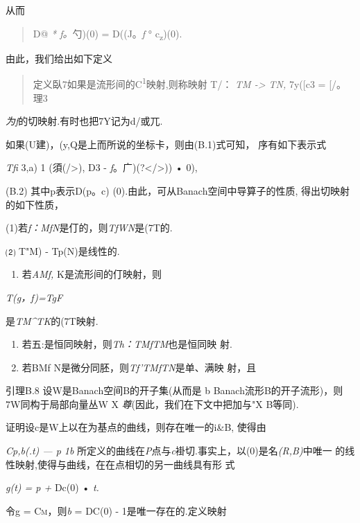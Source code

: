 从而

\begin{quote}
D@ \emph{* f。}勺)(0) = D((J。\emph{f} ° c\textsubscript{z})(0).
\end{quote}

由此，我们给出如下定义

\begin{quote}
定义臥7如果是流形间的C\textsuperscript{1}映射,则称映射 T/： \emph{TM
-\textgreater{} TN,} 7y({[}c3 = {[}/。理3
\end{quote}

\emph{为f}的切映射.有时也把7Y记为d/或兀.

如果(U建)，(y,Q是上而所说的坐标卡，则由(B.1)式可知， 序有如下表示式

\emph{Tfi} 3,a) 1 (須(/\textgreater{}), D3 -
\emph{f}。广)(?\textless{}/\textgreater{})) • 0),

(B.2) 其中p表示D(p。c) (0).由此，可从Banach空间中导算子的性质,
得出切映射的如下性质，

(1)若\emph{f：MfN}是仃的，则\emph{TfWN}是(7T的.

⑵ T"M) - Tp(N)是线性的.

\begin{enumerate}
\def\labelenumi{(\arabic{enumi})}
\setcounter{enumi}{2}
\item
  若\emph{AMf,} K是流形间的仃映射，则
\end{enumerate}

\emph{T(g，f)=TgF}

是\emph{TM\^{}TK}的(7T映射.

\begin{enumerate}
\def\labelenumi{(\arabic{enumi})}
\setcounter{enumi}{3}
\item
  若五:是恒同映射，则\emph{Th：TMfTM}也是恒同映 射.
\item
  若BMf N是微分同胚，则\emph{Tf'TMfTN}是单、满映 射，且
\end{enumerate}

引理B.8 设W是Banach空间B的开子集(从而是 b
Banach流形B的开子流形)，则7W同构于局部向量丛W X
\emph{尊}(因此，我们在下文中把加与"X B等同).

证明设c是W上以在为基点的曲线，则存在唯一的i\&B, 使得由

\emph{Cp,b(.t) --- p 1b}
所定义的曲线在\emph{P}点与\emph{c}褂切.事实上，以(0)是名\emph{(R,B)}中唯一
的线性映射,使得与曲线，在在点相切的另一曲线具有形 式

\emph{g(t) = p +} Dc(0) • \emph{t.}

令g = \textsc{Cm，}则\emph{b} = DC(0) - 1是唯一存在的.定义映射

